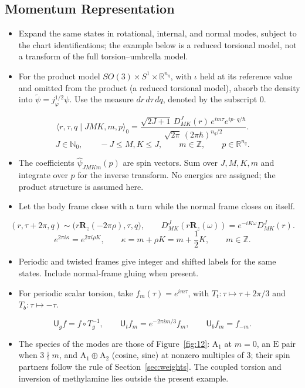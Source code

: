 \documentclass[11pt]{article}
\newcommand{\R}{\mathbb{R}}
\newcommand{\Rmat}{\mathbf{R}}
\newcommand{\Uop}{\mathsf{U}}
\begin{document}
\subsection{Momentum Representation}
\label{sec:momentum}
\begin{itemize}
\item Expand the same states in rotational, internal, and normal modes,
subject to the chart identifications; the example below is a reduced
torsional model, not a transform of the full torsion--umbrella model.
\item For the product model $SO(3)\times S^1\times\R^{n_q}$, with $\iota$ held
at its reference value and omitted from the product (a reduced torsional
model), absorb the density into $\widetilde\psi=j_\varphi^{1/2}\psi$.
Use the measure $dr\,d\tau\,dq$, denoted by the subscript $0$.
\end{itemize}
\[
\langle r,\tau,q\mid JMK,m,p\rangle_0
=\frac{\sqrt{2J+1}\,D^J_{MK}(r)\,e^{im\tau}e^{ip\cdot q/\hbar}}
{\sqrt{2\pi}\,(2\pi\hbar)^{n_q/2}}.
\]
\[
J\in\mathbb N_0,\qquad -J\le M,K\le J,\qquad m\in\mathbb Z,
\qquad p\in\R^{n_q}.
\]
\begin{itemize}
\item The coefficients $\widehat\psi_{JMKm}(p)$ are spin vectors.
Sum over $J,M,K,m$ and integrate over $p$ for the inverse transform.
No energies are assigned; the product structure is assumed here.
\item Let the body frame close with a turn while the normal frame closes on itself.
\end{itemize}
\[
(r,\tau+2\pi,q)\sim\bigl(r\Rmat_z(-2\pi\rho),\tau,q\bigr),
\qquad D^J_{MK}(r\Rmat_z(\omega))=e^{-iK\omega}D^J_{MK}(r).
\]
\[
e^{2\pi i\kappa}=e^{2\pi i\rho K},\qquad
\kappa=m+\rho K=m+\frac12K,\qquad m\in\mathbb Z.
\]
\begin{itemize}
\item Periodic and twisted frames give integer and shifted labels for
the same states. Include normal-frame gluing when present.
\end{itemize}
\begin{itemize}
\item For periodic scalar torsion, take $f_m(\tau)=e^{im\tau}$,
with $T_t:\tau\mapsto\tau+2\pi/3$ and $T_b:\tau\mapsto-\tau$.
\end{itemize}
\[
\Uop_gf=f\circ T_g^{-1},\qquad
\Uop_tf_m=e^{-2\pi im/3}f_m,\qquad \Uop_bf_m=f_{-m}.
\]
\begin{itemize}
\item The species of the modes are those of Figure~\ref{fig:12}: $\mathrm A_1$
at $m=0$, an $\mathrm E$ pair when $3\nmid m$, and $\mathrm A_1\oplus\mathrm A_2$
(cosine, sine) at nonzero multiples of $3$; their spin partners follow the
rule of Section~\ref{sec:weights}. The coupled torsion and inversion of
methylamine lies outside the present example.
\end{itemize}
\end{document}
